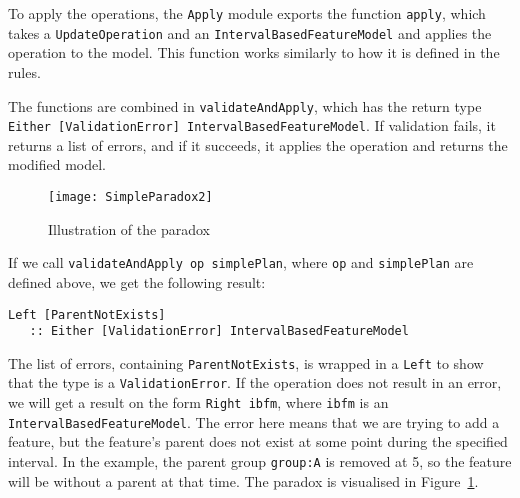 To apply the operations, the \texttt{Apply} module exports the function \texttt{apply}, which takes a \texttt{Update\-Operation} and an \texttt{Interval\-Based\-Feature\-Model} and applies the operation to the model. This function works similarly to how it is defined in the rules.

The functions are combined in \texttt{validate\-And\-Apply}, which has the return type \texttt{Either [Validation\-Error] Interval\-Based\-Feature\-Model}. If validation fails, it returns a list of errors, and if it succeeds, it applies the operation and returns the modified model.
\begin{figure}
   \centering
      \texttt{[image: SimpleParadox2]}
   \caption{Illustration of the paradox}
   \label{ex:simple-plan2}
\end{figure}
If we call \texttt{validateAndApply op simplePlan}, where \texttt{op} and \texttt{simplePlan} are defined above, we get the following result:
\begin{verbatim}
Left [ParentNotExists] 
   :: Either [ValidationError] IntervalBasedFeatureModel
\end{verbatim}
The list of errors, containing \texttt{Parent\-Not\-Exists}, is wrapped in a \texttt{Left} to show that the type is a \texttt{Validation\-Error}. If the operation does not result in an error, we will get a result on the form \texttt{Right ibfm}, where \texttt{ibfm} is an \texttt{Interval\-Based\-Feature\-Model}. The error here means that we are trying to add a feature, but the feature's parent does not exist at some point during the specified interval. In the example, the parent group \texttt{group:A} is removed at 5, so the feature will be without a parent at that time. The paradox is visualised in Figure~\ref{ex:simple-plan2}.

